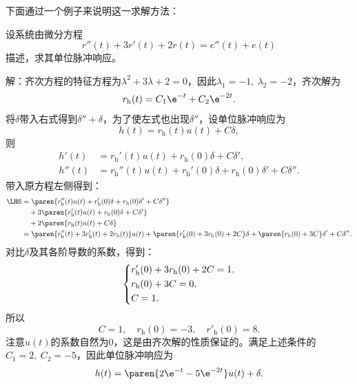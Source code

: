 下面通过一个例子来说明这一求解方法：
\begin{example}
    设系统由微分方程
    \begin{equation}
        r''(t)+3r'(t)+2r(t)=e''(t)+e(t)
    \end{equation}
    描述，求其单位脉冲响应。

    解：齐次方程的特征方程为$\lambda^2+3\lambda+2=0$，因此$\lambda_1=-1,\ \lambda_2=-2$，齐次解为
    \begin{equation}
        r_{\text{h}}(t)=C_1 \e^{-t}+C_2 \e^{-2t}.
    \end{equation}
    将$\delta$带入右式得到$\delta''+\delta$，为了使左式也出现$\delta''$，设单位脉冲响应为
    \begin{equation}
        h(t)=r_{\text{h}}(t)u(t)+C\delta,
    \end{equation}
    则
    \begin{align}
        h'(t)&=r_{\text{h}}'(t)u(t)+r_{\text{h}}(0)\delta+C\delta',\\
        h''(t)&=r_{\text{h}}''(t)u(t)+r_{\text{h}}'(0)\delta+r_{\text{h}}(0)\delta'+C\delta''.
    \end{align}
    带入原方程左侧得到：
    \begin{align}
        \LHS&=\paren{r_{\text{h}}''(t)u(t)+r_{\text{h}}'(0)\delta+r_{\text{h}}(0)\delta'+C\delta''}\nonumber\\
        &\quad+3\paren{r_{\text{h}}'(t)u(t)+r_{\text{h}}(0)\delta+C\delta'}\nonumber\\
        &\quad+2\paren{r_{\text{h}}(t)u(t)+C\delta}\nonumber\\
        &=\paren{r''_{\text{h}}(t)+3r'_{\text{h}}(t)+2r_{\text{h}}(t)}u(t)+\paren{r'_{\text{h}}(0)+3r_{\text{h}}(0)+2C}\delta+\paren{r_{\text{h}}(0)+3C}\delta'+C\delta''.
    \end{align}
    对比$\delta$及其各阶导数的系数，得到：
    \begin{equation}
        \begin{dcases}
            r'_{\text{h}}(0)+3r_{\text{h}}(0)+2C=1,\\
            r_{\text{h}}(0)+3C=0,\\
            C=1.
        \end{dcases}
    \end{equation}
    所以
    \begin{equation}
        C=1,\quad r_{\text{h}}(0)=-3,\quad r'_{\text{h}}(0)=8.
    \end{equation}
    注意$u(t)$的系数自然为$0$，这是由齐次解的性质保证的。满足上述条件的$C_1=2,\ C_2=-5$，因此单位脉冲响应为
    \begin{equation}
        h(t)=\paren{2\e^{-t}-5\e^{-2t}}u(t)+\delta.
    \end{equation}
\end{example}

